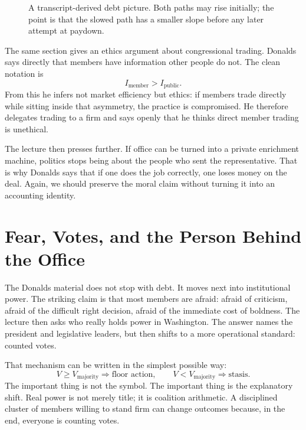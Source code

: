 \begin{figure}[h]
\centering
{}
\caption{A transcript-derived debt picture. Both paths may rise initially; the point is that the slowed path has a smaller slope before any later attempt at paydown.}
\end{figure}

The same section gives an ethics argument about congressional trading. Donalds says directly that members have information other people do not. The clean notation is
\begin{equation}
I_{\text{member}} > I_{\text{public}}.
\end{equation}
From this he infers not market efficiency but ethics: if members trade directly while sitting inside that asymmetry, the practice is compromised. He therefore delegates trading to a firm and says openly that he thinks direct member trading is unethical.

The lecture then presses further. If office can be turned into a private enrichment machine, politics stops being about the people who sent the representative. That is why Donalds says that if one does the job correctly, one loses money on the deal. Again, we should preserve the moral claim without turning it into an accounting identity.

\section{Fear, Votes, and the Person Behind the Office}

The Donalds material does not stop with debt. It moves next into institutional power. The striking claim is that most members are afraid: afraid of criticism, afraid of the difficult right decision, afraid of the immediate cost of boldness. The lecture then asks who really holds power in Washington. The answer names the president and legislative leaders, but then shifts to a more operational standard: counted votes.

That mechanism can be written in the simplest possible way:
\begin{equation}
V\ge V_{\text{majority}} \Rightarrow \text{floor action},\qquad
V<V_{\text{majority}} \Rightarrow \text{stasis}.
\end{equation}
The important thing is not the symbol. The important thing is the explanatory shift. Real power is not merely title; it is coalition arithmetic. A disciplined cluster of members willing to stand firm can change outcomes because, in the end, everyone is counting votes.

